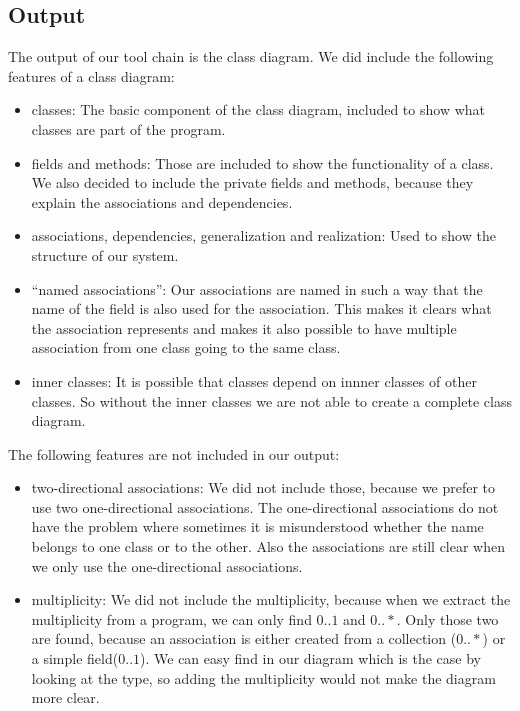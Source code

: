 \documentclass[a4paper,11pt]{article}
\begin{document}
	\subsection{Output}
		The output of our tool chain is the class diagram.
		We did include the following features of a class diagram:
		\begin{itemize}
			\item classes: The basic component of the class diagram, included to show what classes are part of the program.
			\item fields and methods: Those are included to show the functionality of a class. We also decided to include the private fields and methods, because they explain the associations and dependencies.
			\item associations, dependencies, generalization and realization: Used to show the structure of our system.
			\item ``named associations'': Our associations are named in such a way that the name of the field is also used for the association. This makes it clears what the association represents and makes it also possible to have multiple association from one class going to the same class.
			\item inner classes: It is possible that classes depend on innner classes of other classes. So without the inner classes we are not able to create a complete class diagram. %
		\end{itemize}
		
		The following features are not included in our output:
		\begin{itemize}
			\item two-directional associations: We did not include those, because we prefer to use two one-directional associations. The one-directional associations do not have the problem where sometimes it is misunderstood whether the name belongs to one class or to the other. Also the associations are still clear when we only use the one-directional associations.
			\item multiplicity: We did not include the multiplicity, because when we extract the multiplicity from a program, we can only find $0..1$ and $0..*$.
			Only those two are found, because an association is either created from a collection ($0..*$) or a simple field($0..1$).
			We can easy find in our diagram which is the case by looking at the type, so adding the multiplicity would not make the diagram more clear.
		\end{itemize}
		
\end{document}
